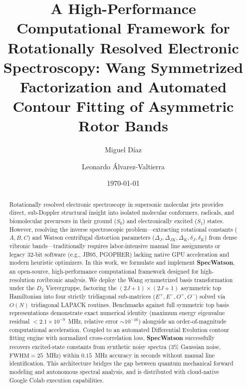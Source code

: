 \documentclass[aps,jcp,reprint,twocolumn,superscriptaddress,showpacs,amsmath,amssymb]{revtex4-2}
\begin{document}
\title{A High-Performance Computational Framework for Rotationally Resolved Electronic Spectroscopy: Wang Symmetrized Factorization and Automated Contour Fitting of Asymmetric Rotor Bands}

\author{Miguel D\'iaz}

\author{Leonardo \'Alvarez-Valtierra}

\date{\today}

\begin{abstract}
Rotationally resolved electronic spectroscopy in supersonic molecular jets provides direct, sub-Doppler structural insight into isolated molecular conformers, radicals, and biomolecular precursors in their ground ($S_0$) and electronically excited ($S_1$) states. However, resolving the inverse spectroscopic problem---extracting rotational constants ($A, B, C$) and Watson centrifugal distortion parameters ($\Delta_J, \Delta_{JK}, \Delta_K, \delta_J, \delta_K$) from dense vibronic bands---traditionally requires labor-intensive manual line assignments or legacy 32-bit software (e.g., JB95, PGOPHER) lacking native GPU acceleration and modern heuristic optimizers. In this work, we formulate and implement \textbf{SpecWatson}, an open-source, high-performance computational framework designed for high-resolution rovibronic analysis. We deploy the Wang symmetrized basis transformation under the $D_2$ Vierergruppe, factoring the $(2J+1) \times (2J+1)$ asymmetric top Hamiltonian into four strictly tridiagonal sub-matrices ($E^+, E^-, O^+, O^-$) solved via $O(N)$ tridiagonal LAPACK routines. Benchmarks against full symmetric top basis representations demonstrate exact numerical identity (maximum energy eigenvalue residual $< 2.1 \times 10^{-9}$~MHz, relative error $\sim 10^{-16}$) alongside an order-of-magnitude computational acceleration. Coupled to an automated Differential Evolution contour fitting engine with normalized cross-correlation loss, \textbf{SpecWatson} successfully recovers excited-state constants from synthetic noisy spectra ($3\%$ Gaussian noise, $\text{FWHM} = 25$~MHz) within $0.15$~MHz accuracy in seconds without manual line identification. This architecture bridges the gap between quantum mechanical forward modeling and autonomous spectral analysis, and is distributed with cloud-native Google Colab execution capabilities.
\end{abstract}
\end{document}
